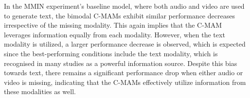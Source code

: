 In the MMIN experiment's baseline model, where both audio and video are used to generate text, the bimodal C-MAMs exhibit similar performance decreases irrespective of the missing modality. This again implies that the C-MAM leverages information equally from each modality. However, when the text modality is utilized, a larger performance decrease is observed, which is expected since the best-performing conditions include the text modality, which is recognised in many studies as a powerful information source. Despite this bias towards text, there remains a significant performance drop when either audio or video is missing, indicating that the C-MAMs effectively utilize information from these modalities as well.
